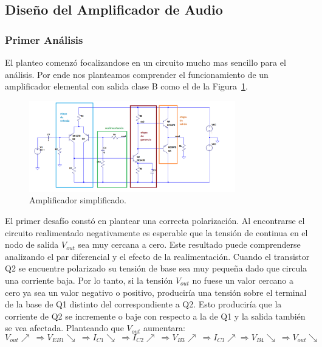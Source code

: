 \subsection{Diseño del Amplificador de Audio}
\bigskip


\subsubsection{Primer Análisis}
 
El planteo comenzó focalizandose en un circuito mucho mas sencillo para el análisis. Por ende nos planteamos comprender el funcionamiento de un amplificador elemental con salida clase B como el de la Figura~\ref{idea_basica}.



\begin{figure}[H]
\centering
\includegraphics[width=0.8\textwidth]{img/idea_basica.png}
\caption{Amplificador simplificado.}
\label{idea_basica} 
\end{figure}

El primer desafío constó en plantear una correcta polarización. Al encontrarse el circuito realimentado negativamente es esperable que la tensión de continua en el nodo de salida $V_{out}$ sea muy cercana a cero. Este resultado puede comprenderse analizando el par diferencial y el efecto de la realimentación. Cuando el transistor Q2 se encuentre polarizado su tensión de base sea muy pequeña dado que circula una corriente baja. Por lo tanto, si la tensión $V_{out}$ no fuese un valor cercano a cero ya sea un valor negativo o positivo, produciría una tensión sobre el terminal de la base de Q1 distinto del correspondiente a Q2. Esto produciría que la corriente de Q2 se incremente o baje con respecto a la de Q1 y la salida también se vea afectada. Planteando que  $V_{out}$ aumentara:
$$
V_{out} \nearrow  ~ \Rightarrow V_{EB1} \searrow ~\Rightarrow I_{C1} \searrow ~\Rightarrow I_{C2} \nearrow ~\Rightarrow V_{B3} \nearrow ~\Rightarrow I_{C3} \nearrow \Rightarrow V_{B4} \searrow ~\Rightarrow V_{out} \searrow
$$

